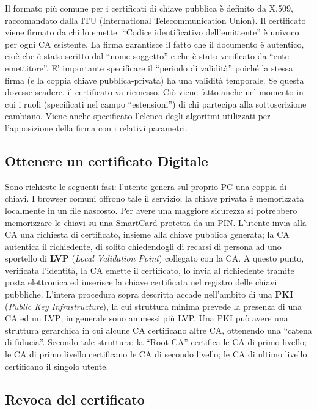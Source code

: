 Il formato più comune per i certificati di chiave pubblica è definito da X.509, raccomandato dalla
ITU (International Telecommunication Union).
Il certificato viene firmato da chi lo emette. “Codice identificativo
dell’emittente” è univoco per ogni
CA esistente. La firma garantisce il fatto che il documento è autentico,
cioè che è stato scritto dal
“nome soggetto” e che è stato verificato da “ente emettitore”.
E’ importante specificare il “periodo di validità” poiché la stessa firma
(e la coppia chiave
pubblica-privata) ha una validità temporale. Se questa dovesse scadere,
il certificato va riemesso.
Ciò viene fatto anche nel momento in cui i ruoli (specificati nel campo
“estensioni”) di chi partecipa
alla sottoscrizione cambiano.
Viene anche specificato l’elenco degli algoritmi utilizzati per
l’apposizione della firma con i relativi
parametri.


\subsection{Ottenere un certificato Digitale}

Sono richieste le seguenti fasi: l’utente genera sul proprio PC una coppia
di chiavi. I browser
comuni offrono tale il servizio; la chiave privata è memorizzata localmente
in un file nascosto. Per
avere una maggiore sicurezza si potrebbero memorizzare le chiavi su una
SmartCard protetta da
un PIN. L’utente invia alla CA una richiesta di certificato, insieme alla
chiave pubblica generata; la
CA autentica il richiedente, di solito chiedendogli di recarsi di persona
ad uno sportello di \textbf{LVP}
(\textit{Local Validation Point}) collegato con la CA.
A questo punto, verificata l’identità, la CA emette il certificato,
lo invia al richiedente tramite posta
elettronica ed inserisce la chiave certificata nel registro delle chiavi
pubbliche.
L’intera procedura sopra descritta accade nell’ambito di una \textbf{PKI}
(\textit{Public Key Infrastructure}), la cui
struttura minima prevede la presenza di una CA ed un LVP; in generale
sono ammessi più LVP.
Una PKI può avere una struttura gerarchica in cui alcune CA certificano
altre CA, ottenendo una
“catena di fiducia”. Secondo tale struttura: la “Root CA” certifica le
CA di primo livello; le CA di
primo livello certificano le CA di secondo livello; le CA di ultimo
livello certificano il singolo utente.

\subsection{Revoca del certificato}


